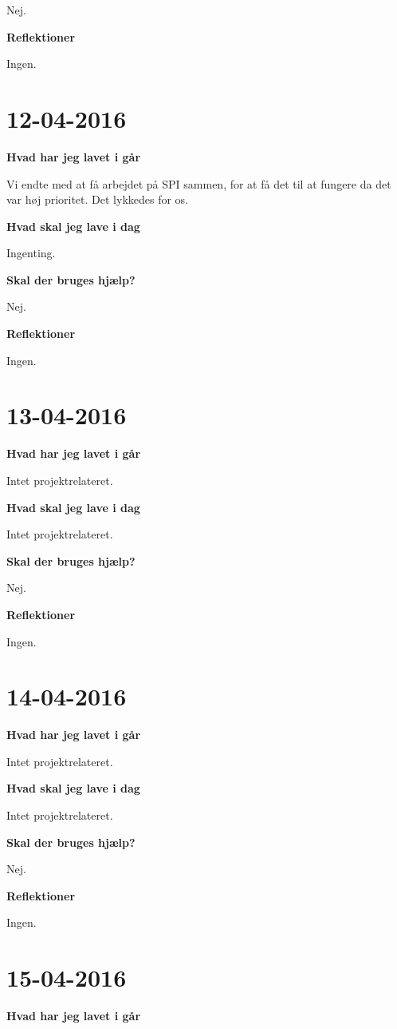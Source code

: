 \documentclass{article}
\begin{document}
	Nej.
	
	\textbf{Reflektioner}
	
	Ingen.
	
	\section{12-04-2016}
	\textbf{Hvad har jeg lavet i går}
	
	Vi endte med at få arbejdet på SPI sammen, for at få det til at fungere da det var høj prioritet. Det lykkedes for os.
	
	\textbf{Hvad skal jeg lave i dag}
	
	Ingenting. 
	
	\textbf{Skal der bruges hjælp?}
	
	Nej.
	
	\textbf{Reflektioner}
	
	Ingen.
	
	\section{13-04-2016}
	\textbf{Hvad har jeg lavet i går}
	
	Intet projektrelateret.
	
	\textbf{Hvad skal jeg lave i dag}
	
	Intet projektrelateret. 
	
	\textbf{Skal der bruges hjælp?}
	
	Nej.
	
	\textbf{Reflektioner}
	
	Ingen.
	
	\section{14-04-2016}
	\textbf{Hvad har jeg lavet i går}
	
	Intet projektrelateret.
	
	\textbf{Hvad skal jeg lave i dag}
	
	Intet projektrelateret.
	
	\textbf{Skal der bruges hjælp?}
	
	Nej.
	
	\textbf{Reflektioner}
	
	Ingen.
	
	\section{15-04-2016}
	\textbf{Hvad har jeg lavet i går}
	
\end{document}
